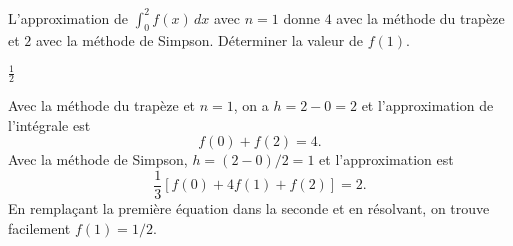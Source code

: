 \begin{exercice}
  L'approximation de $\int_0^2 f(x)\, dx$ avec $n = 1$ donne $4$ avec la
  méthode du trapèze et $2$ avec la méthode de Simpson. Déterminer la
  valeur de $f(1)$.
  \begin{rep}
    $\frac{1}{2}$
  \end{rep}
  \begin{sol}
    Avec la méthode du trapèze et $n = 1$, on a $h = 2 - 0 = 2$ et
    l'approximation de l'intégrale est
    \begin{equation*}
      f(0) + f(2) = 4.
    \end{equation*}
    Avec la méthode de Simpson, $h = (2 - 0)/2 = 1$ et l'approximation est
    \begin{equation*}
      \frac{1}{3}[f(0) + 4 f(1) + f(2)] = 2.
    \end{equation*}
    En remplaçant la première équation dans la seconde et en
    résolvant, on trouve facilement $f(1) = 1/2$.
  \end{sol}
\end{exercice}





